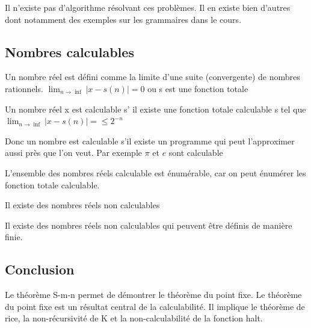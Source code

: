 Il n'existe pas d'algorithme résolvant ces problèmes. Il en existe bien d'autres 
dont notamment des exemples sur les grammaires dans le cours.

\subsection{Nombres calculables}
\label{sub:nombres_calculables}

\begin{mydef}
	Un nombre réel est défini comme la limite d'une suite (convergente) de 
	nombres rationnels. $\lim_{n \rightarrow \inf} |x-s(n)| = 0 $ ou s est 
	une fonction totale
\end{mydef}

\begin{mydef}
	Un nombre réel x est calculable s’ il existe une fonction totale 
	calculable s tel que $\lim_{n \rightarrow \inf} |x-s(n)| =\leq 2^{-n}$
\end{mydef}

\begin{myrem}
	Donc un nombre est calculable s'il existe un programme qui peut 
	l'approximer aussi près que l'on veut. Par exemple $\pi$ et $e$ sont 
	calculable
\end{myrem}

\begin{myprop}
	L'ensemble des nombres réels calculable est énumérable, car on peut énumérer les 
	fonction totale calculable.	
\end{myprop}

\begin{myprop}
	Il existe des nombres réels non calculables
\end{myprop}

\begin{myprop}
	Il existe des nombres réels non calculables qui peuvent être définis de 
	manière finie.
\end{myprop}


\subsection{Conclusion}

Le théorème S-m-n permet de démontrer le théorème du point fixe.
Le théorème du point fixe est un résultat central de la calculabilité. Il 
implique le théorème de rice, la non-récursivité de K et la non-calculabilité 
de la fonction halt.

